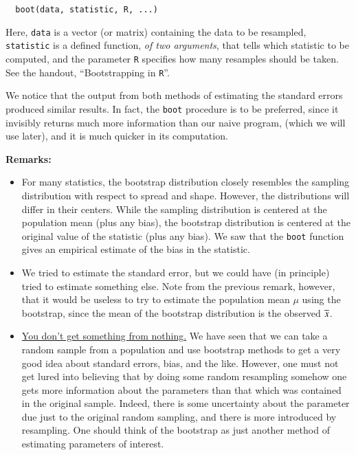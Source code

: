 \documentclass[captions=tableheading]{scrbook}
\begin{document}
\begin{verbatim}
  boot(data, statistic, R, ...)
\end{verbatim}


Here, \texttt{data} is a vector (or matrix) containing the data to be resampled, \texttt{statistic} is a defined function, \emph{of two arguments}, that tells which statistic to be computed, and the parameter \texttt{R} specifies how many resamples should be taken. See the handout, ``Bootstrapping in \texttt{R}''.

 

We notice that the output from both methods of estimating the standard errors produced similar results. In fact, the \texttt{boot} procedure is to be preferred, since it invisibly returns much more information than our naive program, (which we will use later), and it is much quicker in its computation.  


\textbf{Remarks:}

\begin{itemize}
\item For many statistics, the bootstrap distribution closely resembles the sampling distribution with respect to spread and shape. However, the distributions will differ in their centers. While the sampling distribution is centered at the population mean (plus any bias), the bootstrap distribution is centered at the original value of the statistic (plus any bias). We saw that the \texttt{boot} function gives an empirical estimate of the bias in the statistic.
\item We tried to estimate the standard error, but we could have (in principle) tried to estimate something else. Note from the previous remark, however, that it would be useless to try to estimate the population mean $\mu$ using the bootstrap, since the mean of the bootstrap distribution is the observed $\overline{x}$.
\item \underline{You don't get something from nothing.} We have seen that we can take a random sample from a population and use bootstrap methods to get a very good idea about standard errors, bias, and the like. However, one must not get lured into believing that by doing some random resampling somehow one gets more information about the parameters than that which was contained in the original sample. Indeed, there is some uncertainty about the parameter due just to the original random sampling, and there is more introduced by resampling. One should think of the bootstrap as just another method of estimating parameters of interest.
\end{itemize}
\end{document}
